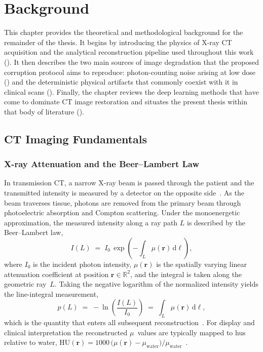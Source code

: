 \chapter{Background}
\label{chap:background}

This chapter provides the theoretical and methodological background for the remainder of the thesis. It begins by introducing the physics of X-ray CT acquisition and the analytical reconstruction pipeline used throughout this work (). It then describes the two main sources of image degradation that the proposed corruption protocol aims to reproduce: photon-counting noise arising at low dose () and the deterministic physical artifacts that commonly coexist with it in clinical scans (). Finally, the chapter reviews the deep learning methods that have come to dominate CT image restoration and situates the present thesis within that body of literature ().

\section{CT Imaging Fundamentals}
\label{sec:bg_ct_fundamentals}

\subsection{X-ray Attenuation and the Beer--Lambert Law}
\label{subsec:bg_beer_lambert}

In transmission CT, a narrow X-ray beam is passed through the patient and the transmitted intensity is measured by a detector on the opposite side~\cite{Hounsfield1973, KakSlaney1988}. As the beam traverses tissue, photons are removed from the primary beam through photoelectric absorption and Compton scattering. Under the monoenergetic approximation, the measured intensity along a ray path $L$ is described by the Beer--Lambert law,
\begin{equation}
    I(L) \;=\; I_{0}\,\exp\!\left(-\int_{L} \mu(\boldsymbol{r})\,\mathrm{d}\ell\right),
    \label{eq:beer_lambert}
\end{equation}
where $I_0$ is the incident photon intensity, $\mu(\boldsymbol{r})$ is the spatially varying linear attenuation coefficient at position $\boldsymbol{r} \in \mathbb{R}^{2}$,
and the integral is taken along the geometric ray~$L$. Taking the negative logarithm of the normalized intensity yields the line-integral measurement,
\begin{equation}
    p(L) \;=\; -\ln\!\left(\frac{I(L)}{I_{0}}\right) \;=\; \int_{L} \mu(\boldsymbol{r})\,\mathrm{d}\ell,
    \label{eq:line_integral}
\end{equation}
which is the quantity that enters all subsequent reconstruction~\cite{KakSlaney1988, Buzug2008}. For display and clinical interpretation the reconstructed $\mu$~values are typically
mapped to \glspl{hu} relative to water, $\mathrm{HU}(\boldsymbol{r}) = 1000\,\bigl(\mu(\boldsymbol{r}) - \mu_{\text{water}}\bigr)/\mu_{\text{water}}$~\cite{Hounsfield1973}.

